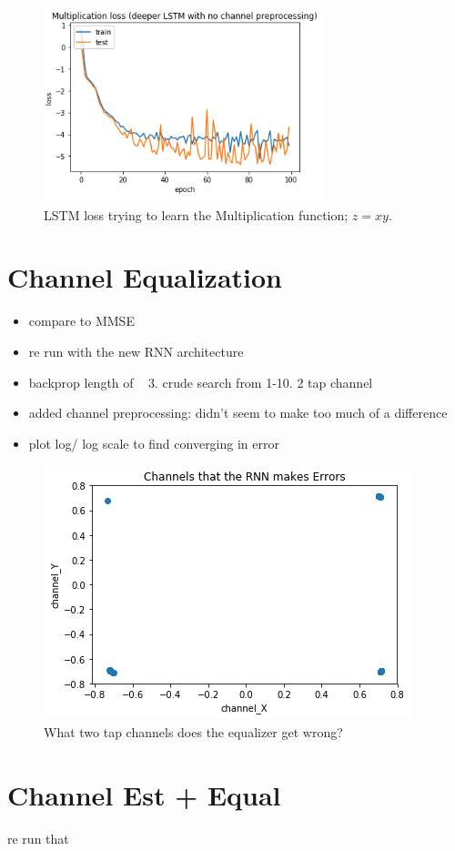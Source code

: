 \begin{figure}
\begin{center}
\includegraphics{figures/equal/LSTM_loss_multiplication.png}
\caption{LSTM loss trying to learn the Multiplication function; $z=xy$.}
\end{center}
\label{fig:lstm_loss_mult}
\end{figure}


\section{Channel Equalization}

\begin{itemize}
\item compare to MMSE
\item re run with the new RNN architecture
\item backprop length of ~ 3. crude search from 1-10. 2 tap channel
\item added channel preprocessing: didn't seem to make too much of a difference
\item plot log/ log scale to find converging in error
\end{itemize}

\begin{figure}
\begin{center}
\includegraphics{figures/equal/incorrect_channels.png}
\caption{What two tap channels does the equalizer get wrong?}
\end{center}
\label{fig:incorr_chan}
\end{figure}

\section{Channel Est + Equal}
re run that 